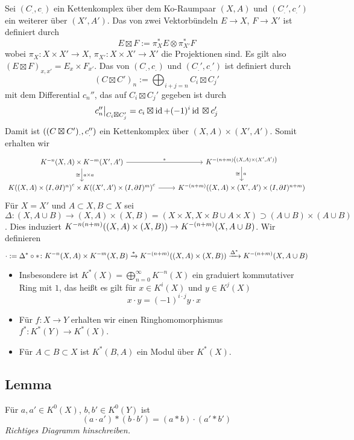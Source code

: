 Sei $(C_.,c_.)$ ein Kettenkomplex über dem Ko-Raumpaar $(X,A)$ und $(C_.',c_.')$ ein weiterer über $(X',A')$. Das  von zwei Vektorbündeln $E \to X$,
$F \to X'$ ist definiert durch 
\[
	E \boxtimes F := \pi_X^* E \otimes \pi_{X'}^* F
\]
wobei $\pi_X \colon X \times X' \to X$, $\pi_{X'} \colon X \times X' \to X'$ die Projektionen sind. Es gilt also $(E \boxtimes F)_{x,x'} = E_x \times F_{x'}$.
Das  von $(C_.,c_.)$ und $(C_.',c_.')$ ist definiert durch 
\[
	(C \boxtimes C')_n := \bigoplus_{i+j=n} C_i \boxtimes C_j'
\]
mit dem Differential $c_n''$, das auf $C_i \boxtimes C_j'$ gegeben ist durch 
\[
	c_n'' \big|_{C_i \boxtimes C_j'} = c_i \boxtimes \id + (-1)^i \id{} \boxtimes c_j'
\]
Damit ist $\enbrace*{(C \boxtimes C')_., c_.''} $ ein Kettenkomplex über $(X,A) \times (X',A')$. Somit erhalten wir 
\[	  
	\begin{tikzcd}
		K^{-n}(X,A) \times K^{-m}(X',A') \dar["a \times a","\cong"'] \rar["*"] & K^{-(n+m) \enbrace*{(X,A) \times (X',A')} } \dar["a","\cong"'] \\
		K \enbrace*{(X,A) \times (I, \partial I)^n}^c \times K \enbrace*{(X',A') \times (I, \partial I)^m}^c \rar &
		K^{-(n+m)} \enbrace*{(X,A) \times (X',A') \times (I,\partial I)^{n+m}}    
	\end{tikzcd}
\]
Für $X=X'$ und $A \subset X, B \subset X$ sei 
$\Delta \colon (X,A \cup B) \to (X,A) \times (X,B)= (X\times X, X \times B \cup A \times X) \supset (A \cup B) \times (A \cup B)$. Dies induziert 
$K^{-n(n+m)} \enbrace*{(X,A) \times (X,B)} \to K^{-(n+m)}(X, A \cup B) $. Wir definieren
\[
	\cdot := \Delta^* \circ * \colon K^{-n}(X,A) \times K^{-m}(X,B) \xrightarrow{*} K^{-(n+m)} \enbrace*{(X,A) \times (X,B)}\xrightarrow{\Delta^*} K^{-(n+m)}(X,A \cup B)   
\]
\begin{itemize}
	\item Insbesondere ist $K^*(X) = \bigoplus_{n=0}^\infty K^{-n}(X)$ ein graduiert kommutativer Ring mit $1$, das heißt es gilt für $x \in K^i(X)$ und $y \in K^j(X)$
	\[
		x \cdot y = (-1)^{i \cdot j} y \cdot x
	\]
	\item Für $f \colon X \to Y$ erhalten wir einen Ringhomomorphismus $f^* \colon K^*(Y) \to K^*(X)$.
	\item Für $A \subset B \subset X$ ist $K^*(B,A)$ ein Modul über $K^*(X)$.
\end{itemize}

\subsection*{Lemma}
Für $a,a' \in K^0(X)$, $b,b' \in K^0(Y)$ ist 
\[
	(a \cdot a') * (b \cdot b') = (a * b) \cdot (a' * b')
\]
\emph{Richtiges Diagramm hinschreiben.}

